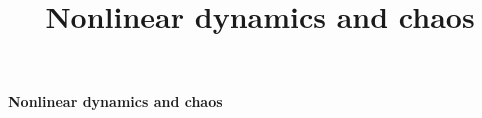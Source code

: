 \documentclass[10pt,landscape]{article}
\title{Nonlinear dynamics and chaos}
\begin{document}
\raggedright
\footnotesize

\begin{center}
     \Large{\textbf{Nonlinear dynamics and chaos}} \\
\end{center}
\begin{multicols}{3}
\setlength{\premulticols}{1pt}
\setlength{\postmulticols}{1pt}
\setlength{\multicolsep}{1pt}
\setlength{\columnsep}{2pt}


\newcommand{\R}{\mathbb{R}}
\newcommand{\Q}{\mathbb{Q}}
\newcommand{\Z}{\mathbb{Z}}
\newcommand{\N}{\mathbb{N}}
\newcommand{\Co}{\mathbb{C}}





\newpage

\end{multicols}
\end{document}
